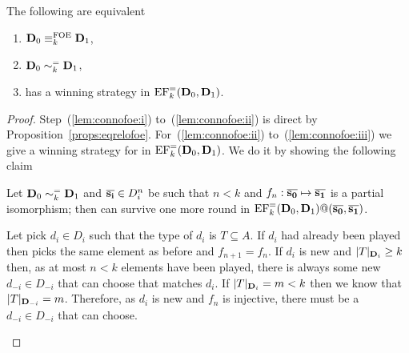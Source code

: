 \begin{lemma}\label{lem:connofoe}
	The following are equivalent
	\begin{enumerate}
		 pt
		\item\label{lem:connofoe:i} $\mathbf{D}_0 \equiv_k^\mathrm{FOE} \mathbf{D}_1$,
		\item\label{lem:connofoe:ii} $\mathbf{D}_0 \sim_k^= \mathbf{D}_1$,
		\item\label{lem:connofoe:iii} \eloise has a winning strategy in $\mathrm{EF}_k^=(\mathbf{D}_0,\mathbf{D}_1)$.
	\end{enumerate}
\end{lemma}
\begin{proof}
	Step~(\ref{lem:connofoe:i}) to~(\ref{lem:connofoe:ii}) is direct by Proposition~\ref{props:eqrelofoe}. For~(\ref{lem:connofoe:ii}) to~(\ref{lem:connofoe:iii}) we give a winning strategy for \eloise in $\mathrm{EF}_k^=(\mathbf{D}_0,\mathbf{D}_1)$. We do it by showing the following claim
	\begin{claimfirst}
	Let $\mathbf{D}_0 \sim_k^= \mathbf{D}_1$ and $\overline{{\mathbf{s_i}}} \in D_i^n$ be such that $n<k$ and $f_n:\overline{{\mathbf{s_0}}}\mapsto\overline{{\mathbf{s_1}}}$ is a partial isomorphism; then \eloise can survive one more round in $\mathrm{EF}_{k}^=(\mathbf{D}_0,\mathbf{D}_1)@(\overline{{\mathbf{s_0}}},\overline{{\mathbf{s_1}}})$.
	\end{claimfirst}
	\begin{pfclaim}
		Let \abelard pick $d_i\in D_i$ such that the type of $d_i$ is $T \subseteq A$. If $d_i$ had already been played then \eloise picks the same element as before and $f_{n+1} = f_n$. If $d_i$ is new and $|T|_{\mathbf{D}_i} \geq k$ then, as at most $n<k$ elements have been played, there is always some new $d_{-i} \in D_{-i}$ that \eloise can choose that matches $d_i$. If $|T|_{\mathbf{D}_i} = m < k$ then we know that $|T|_{\mathbf{D}_{-i}} = m$. Therefore, as $d_i$ is new and $f_n$ is injective, there must be a $d_{-i} \in D_{-i}$ that \eloise can choose. %
	\end{pfclaim}
	

\end{proof}
